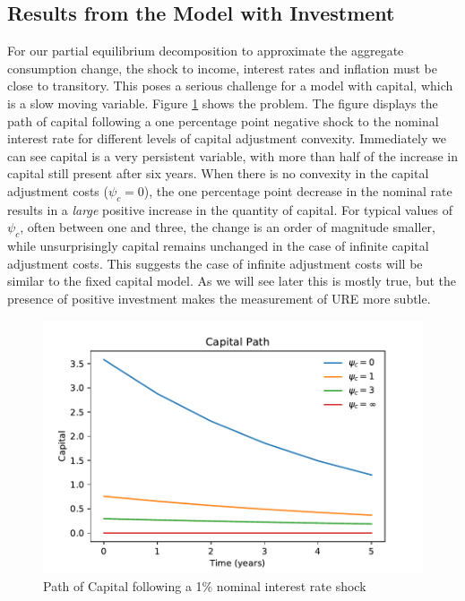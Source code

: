 \documentclass[12pt,a4paper]{article}
\begin{document}
\subsection{Results from the Model with Investment}
For our partial equilibrium decomposition to approximate the aggregate consumption change, the shock to income, interest rates and inflation must be close to transitory. This poses a serious challenge for a model with capital, which is a slow moving variable. Figure \ref{fig:PathCap} shows the problem. The figure displays the path of capital following a one percentage point negative shock to the nominal interest rate for different levels of capital adjustment convexity. Immediately we can see capital is a very persistent variable, with more than half of the increase in capital still present after six years. When there is no convexity in the capital adjustment costs ($\psi_c = 0$), the one percentage point decrease in the nominal rate results in a \textit{large} positive increase in the quantity of capital. For typical values of $\psi_c$, often between one and three, the change is an order of magnitude smaller, while unsurprisingly capital remains unchanged in the case of infinite capital adjustment costs. This suggests the case of infinite adjustment costs will be similar to the fixed capital model. As we will see later this is mostly true, but the presence of positive investment makes the measurement of URE more subtle.

\begin{figure} 
	\begin{centering}
		\includegraphics[scale=0.7]{../Python/DoloCode/Figures/TANK_capital_IRF_k.pdf}
		\caption{Path of Capital following a 1\% nominal interest rate shock}
		\label{fig:PathCap}
	\end{centering}
\end{figure}
\end{document}
